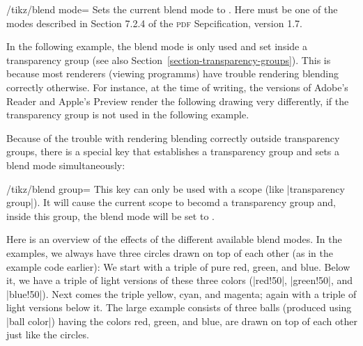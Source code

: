 \begin{key}{/tikz/blend mode=}
  Sets the current blend mode to . Here  must be
  one of the modes described in Section 7.2.4 of the \textsc{pdf}
  Sepcification, version 1.7.

  In the following example, the blend mode is only used and set inside
  a transparency group (see also
  Section~\ref{section-transparency-groups}). This is because most
  renderers (viewing 
  programms) have trouble rendering blending correctly otherwise. For
  instance, at the time of writing, the versions of Adobe's Reader and
  Apple's Preview render the following drawing very differently, if
  the transparency group is not used in the following example.

\begin{codeexample}[]
\end{codeexample}

  Because of the trouble with rendering blending correctly outside
  transparency groups, there is a special key that establishes a
  transparency group and sets a blend mode simultaneously:
  
  \begin{key}{/tikz/blend group=}
    This key can only be used with a scope (like
    |transparency group|). It will cause the current scope to becomd a
    transparency group and, inside this group, the blend mode will be
    set to .

\begin{codeexample}[]
\end{codeexample}
  \end{key}

  Here is an overview of the effects of the different available blend
  modes. In the examples, we always have three circles drawn on
  top of each other (as in the example code earlier): We start with a
  triple of pure red, green, and blue. Below it, we have a triple of
  light versions of these three colors (|red!50|, |green!50|, and
  |blue!50|). Next comes the triple  yellow, cyan, and magenta; again
  with a triple of light versions below it. The large example consists
  of three balls (produced using |ball color|) having the colors red,
  green, and blue, are drawn on top of each other just like the
  circles.  
  

\end{key}
